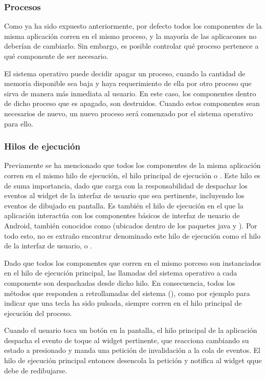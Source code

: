 \subsubsection{Procesos}
    Como ya ha sido expuesto anteriormente, por defecto todos los componentes de la misma aplicación corren en el mismo proceso, y la mayoría de las aplicacones no deberían de cambiarlo. Sin embargo, es posible controlar qué proceso pertenece a qué componente de ser necesario.

    El sistema operativo puede decidir apagar un proceso, cuando la cantidad de memoria disponible sea baja y haya requerimiento de ella por otro proceso que sirva de manera más inmediata al usuario. En este caso, los componentes dentro de dicho proceso que es apagado, son destruidos. Cuando estos componentes sean necesarios de nuevo, un nuevo proceso será comenzado por el sistema operativo para ello.

\subsubsection{Hilos de ejecución}
    Previamente se ha mencionado que todos los componentes de la misma aplicación corren en el mismo hilo de ejecución, el hilo principal de ejecución o . Este hilo es de suma importancia, dado que carga con la responsabilidad de despachar los eventos al widget de la interfaz de usuario que sea pertinente, incluyendo los eventos de dibujado en pantalla. Es también el hilo de ejecución en el que la aplicación interactúa con los componentes básicos de interfaz de usuario de Android, también conocidos como  (ubicados dentro de los paquetes java  y ). Por todo esto, no es extraño encontrar denominado este hilo de ejecución como el hilo de la interfaz de usuario, o .

    Dado que todos los componentes que corren en el mismo porceso son instanciados en el hilo de ejecución principal, las llamadas del sistema operativo a cada componente son despachadas desde dicho hilo. En consecuencia, todos los métodos que responden a retrollamadas del sistema (), como por ejemplo para indicar que una tecla ha sido pulsada, siempre corren en el hilo principal de ejecución del proceso.

    Cuando el usuario toca un botón en la pantalla, el hilo principal de la aplicación despacha el evento de toque al widget pertinente, que reacciona cambiando su estado a presionado y manda una petición de invalidación a la cola de eventos. El hilo de ejecución principal entonces desencola la petición y notifica al widget qque debe de redibujarse.

